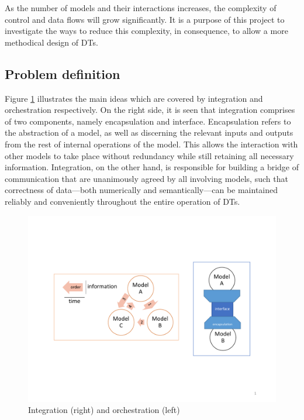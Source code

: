 \documentclass[journal,onecolumn]{IEEEtran} %
\begin{document}
As the number of models and their interactions increases, the complexity of control and data flows will grow significantly. It is a purpose of this project to investigate the ways to reduce this complexity, in consequence, to allow a more methodical design of DTs.

\subsection{Problem definition}\label{sec:prodef}
Figure \ref{fig:intorc} illustrates the main ideas which are covered by integration and orchestration respectively. On the right side, it is seen that integration comprises of two components, namely encapsulation and interface. Encapsulation refers to the abstraction of a model, as well as discerning the relevant inputs and outputs from the rest of internal operations of the model. This allows the interaction with other models to take place without redundancy while still retaining all necessary information. Integration, on the other hand, is responsible for building a bridge of communication that are unanimously agreed by all involving models, such that correctness of data---both numerically and semantically---can be maintained reliably and conveniently throughout the entire operation of DTs.

\begin{figure}[hbt!]
  \centering
  \includegraphics[scale=0.5]{figures/intorc.pdf}
  \caption{Integration (right) and orchestration (left)}
  \label{fig:intorc}
\end{figure}
\end{document}
